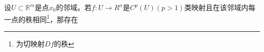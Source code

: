 
\begin{theorem}{}
设$U\subset \mathbb R^m$是点$x_0$的邻域。若$f:U\rightarrow R^n$是$ C^p(U)(p>1)$类映射且在该邻域内每一点的秩相同\footnote{为切映射$Df$的秩}，那存在

\end{theorem}
